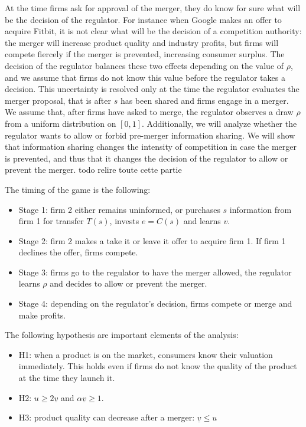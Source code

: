 \documentclass[a4paper,leqno]{article}%
\renewcommand{\a}{\alpha}
\newcommand{\uv}{\underline{v}}
\begin{document}
At the time firms ask for approval of the merger, they do know for sure what will be the decision of the regulator. For instance when Google makes an offer to acquire Fitbit, it is not clear what will be the decision of a competition authority: the merger will increase product quality and industry profits, but firms will compete fiercely if the merger is prevented, increasing consumer surplus. The decision of the regulator balances these two effects depending on the value of $\rho$, and we assume that firms do not know this value before the regulator takes a decision. This uncertainty is resolved only at the time the regulator evaluates the merger proposal, that is after $s$ has been shared and firms engage in a merger. We assume that, after firms have asked to merge, the regulator observes a draw $\rho$ from a uniform distribution on $[0,1]$. Additionally, we will analyze whether the regulator wants to allow or forbid pre-merger information sharing. We will show that information sharing changes the intensity of competition in case the merger is prevented, and thus that it changes the decision of the regulator to allow or prevent the merger.
todo relire toute cette partie


The timing of the game is the following:


\begin{itemize}[label={-}]
    \item Stage 1: firm 2 either remains uninformed, or purchases $s$ information from firm 1 for transfer $T(s)$, invests $e=C(s)$ and learns $v$.
    \item Stage 2: firm 2 makes a take it or leave it offer to acquire firm 1. If firm 1 declines the offer, firms compete.
    \item Stage 3: firms go to the regulator to have the merger allowed, the regulator learns $\rho$ and decides to allow or prevent the merger.
    \item Stage 4: depending on the regulator's decision, firms compete or merge and make profits.
\end{itemize}


The following hypothesis are important elements of the analysis:

\begin{itemize}[label={-}]
    \item H1: when a product is on the market, consumers know their valuation immediately. This holds even if firms do not know the quality of the product at the time they launch it. 
    \item H2: $u\geq 2\uv$ and $\a\uv\geq1$.
    \item H3: product quality can decrease after a merger: $\uv\leq u$
\end{itemize}
\end{document}
